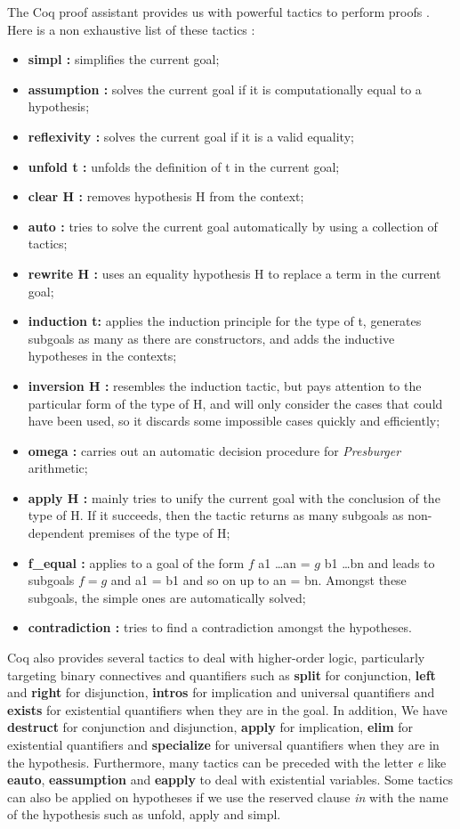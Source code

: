 The Coq proof assistant provides us with powerful tactics to perform proofs \cite{Coq}. Here is a non exhaustive list of these tactics :
\begin{itemize}
\item \textbf{simpl :} simplifies the current goal;
	\item \textbf{assumption :} solves the current goal if it is computationally equal to a hypothesis;
	\item \textbf{reflexivity :} solves the current goal if it is a valid equality;
	\item \textbf{unfold t :} unfolds the definition of t in the current goal;
	\item \textbf{clear H :} removes hypothesis H from the context;
	\item \textbf{auto :} tries to solve the current goal automatically by using a collection of tactics;
	\item \textbf{rewrite H :} uses an equality hypothesis H to replace a term in the current goal;	
	\item \textbf{induction t:} applies the induction principle for the type of t, generates subgoals as many as there are constructors, and adds the inductive hypotheses in the contexts;
	\item \textbf{inversion H :} resembles the induction tactic, but pays attention to the particular form of the type of H, and will only consider the cases that could have been used, so it discards some impossible cases quickly and efficiently;
	\item \textbf{omega :} carries out an automatic decision procedure for \textit{Presburger} arithmetic;
	\item \textbf{apply H :} mainly tries to unify the current goal with the conclusion of the type of H. If it succeeds, then the tactic returns as many subgoals as non-dependent premises of the type of H;
	\item \textbf{f\_equal :} applies to a goal of the form $f$ a{\tiny 1} \dots a{\tiny n} = $g$ b{\tiny 1} \dots b{\tiny n} and leads to subgoals $f = g$ and a{\tiny 1} = b{\tiny 1} and so on up to a{\tiny n} = b{\tiny n}. Amongst these subgoals, the simple ones are automatically solved;
	\item \textbf{contradiction :} tries to find a contradiction amongst the hypotheses.	
\end{itemize}
Coq also provides several tactics to deal with higher-order logic, particularly targeting binary connectives and quantifiers such as \textbf{split} for conjunction, \textbf{left} and \textbf{right} for disjunction, \textbf{intros} for implication and universal quantifiers and \textbf{exists} for existential quantifiers when they are in the goal. In addition, We have \textbf{destruct} for conjunction and disjunction, \textbf{apply} for implication, \textbf{elim} for existential quantifiers and \textbf{specialize} for universal quantifiers when they are in the hypothesis. Furthermore, many tactics can be preceded with the letter \textit{e} like \textbf{eauto}, \textbf{eassumption} and \textbf{eapply} to deal with existential variables. Some tactics can also be applied on hypotheses if we use the reserved clause \textit{in} with the name of the hypothesis such as unfold, apply and simpl. 

